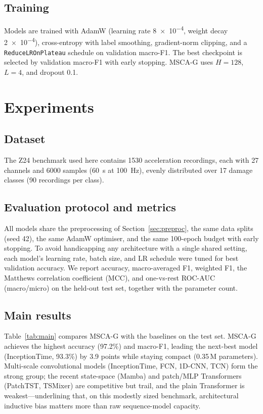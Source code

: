 \documentclass[11pt]{article}
\newcommand{\result}[1]{#1}
\begin{document}
\subsection{Training}
Models are trained with AdamW (learning rate \num{8e-4}, weight decay
\num{2e-4}), cross-entropy with label smoothing, gradient-norm clipping, and a
\texttt{ReduceLROnPlateau} schedule on validation macro-F1. The best checkpoint
is selected by validation macro-F1 with early stopping. MSCA-G uses
$H=\num{128}$, $L=\num{4}$, and dropout \num{0.1}.

\section{Experiments}
\label{sec:experiments}

\subsection{Dataset}
The Z24 benchmark used here contains \num{1530} acceleration recordings, each
with \num{27} channels and \num{6000} samples (\SI{60}{\second} at
\SI{100}{\hertz}), evenly distributed over \num{17} damage classes
(\num{90} recordings per class).

\subsection{Evaluation protocol and metrics}
All models share the preprocessing of Section~\ref{sec:preproc}, the same data
splits (seed \num{42}), the same AdamW optimiser, and the same \num{100}-epoch
budget with early stopping. To avoid handicapping any architecture with a single
shared setting, each model's learning rate, batch size, and LR schedule were
tuned for best validation accuracy. We report accuracy, macro-averaged F1,
weighted F1, the Matthews correlation coefficient (MCC), and one-vs-rest ROC-AUC
(macro/micro) on the held-out test set, together with the parameter count.

\subsection{Main results}
\label{sec:results}
Table~\ref{tab:main} compares MSCA-G with the baselines on the test set.
MSCA-G achieves the highest accuracy (\result{97.2}\%) and macro-F1, leading the
next-best model (InceptionTime, \result{93.3}\%) by \result{3.9} points while
staying compact (\result{0.35}\,M parameters). Multi-scale convolutional models
(InceptionTime, FCN, 1D-CNN, TCN) form the strong group; the recent state-space
(Mamba) and patch/MLP Transformers (PatchTST, TSMixer) are competitive but trail,
and the plain Transformer is weakest---underlining that, on this modestly sized
benchmark, architectural inductive bias matters more than raw sequence-model
capacity.
\end{document}
